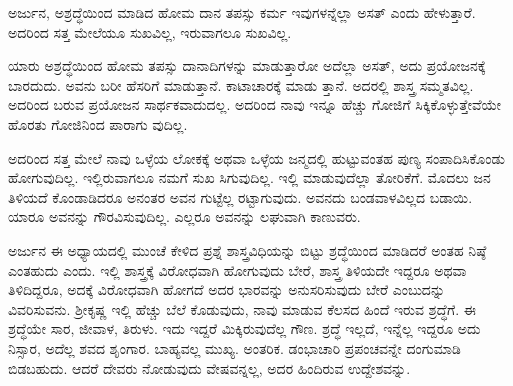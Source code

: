 {\small ಅರ್ಜುನ, ಅಶ್ರದ್ಧೆಯಿಂದ ಮಾಡಿದ ಹೋಮ ದಾನ ತಪಸ್ಸು ಕರ್ಮ ಇವುಗಳನ್ನೆಲ್ಲಾ ಅಸತ್ ಎಂದು ಹೇಳುತ್ತಾರೆ. ಅದರಿಂದ ಸತ್ತ ಮೇಲೆಯೂ ಸುಖವಿಲ್ಲ, ಇರುವಾಗಲೂ ಸುಖವಿಲ್ಲ.}

ಯಾರು ಅಶ್ರದ್ಧೆಯಿಂದ ಹೋಮ ತಪಸ್ಸು ದಾನಾದಿಗಳನ್ನು ಮಾಡುತ್ತಾರೋ ಅದೆಲ್ಲಾ ಅಸತ್, ಅದು ಪ್ರಯೋಜನಕ್ಕೆ ಬಾರದುದು. ಅವನು ಬರೀ ಹೆಸರಿಗೆ ಮಾಡುತ್ತಾನೆ. ಕಾಟಾಚಾರಕ್ಕೆ ಮಾಡು ತ್ತಾನೆ. ಅದರಲ್ಲಿ ಶಾಸ್ತ್ರ ಸಮ್ಮತವಿಲ್ಲ. ಅದರಿಂದ ಬರುವ ಪ್ರಯೋಜನ ಸಾರ್ಥಕವಾದುದಲ್ಲ. ಅದರಿಂದ ನಾವು ಇನ್ನೂ ಹೆಚ್ಚು ಗೋಜಿಗೆ ಸಿಕ್ಕಿಕೊಳ್ಳುತ್ತೇವೆಯೇ ಹೊರತು ಗೋಜಿನಿಂದ ಪಾರಾಗು ವುದಿಲ್ಲ.

ಅದರಿಂದ ಸತ್ತ ಮೇಲೆ ನಾವು ಒಳ್ಳೆಯ ಲೋಕಕ್ಕೆ ಅಥವಾ ಒಳ್ಳೆಯ ಜನ್ಮದಲ್ಲಿ ಹುಟ್ಟುವಂತಹ ಪುಣ್ಯ ಸಂಪಾದಿಸಿಕೊಂಡು ಹೋಗುವುದಿಲ್ಲ. ಇಲ್ಲಿರುವಾಗಲೂ ನಮಗೆ ಸುಖ ಸಿಗುವುದಿಲ್ಲ. ಇಲ್ಲಿ ಮಾಡುವುದೆಲ್ಲಾ ತೋರಿಕೆಗೆ. ಮೊದಲು ಜನ ತಿಳಿಯದೆ ಕೊಂಡಾಡಿದರೂ ಅನಂತರ ಅವನ ಗುಟ್ಟೆಲ್ಲ ರಟ್ಟಾಗುವುದು. ಅವನದು ಬಂಡವಾಳವಿಲ್ಲದ ಬಡಾಯಿ. ಯಾರೂ ಅವನನ್ನು ಗೌರವಿಸುವುದಿಲ್ಲ. ಎಲ್ಲರೂ ಅವನನ್ನು ಲಘುವಾಗಿ ಕಾಣುವರು.

ಅರ್ಜುನ ಈ ಅಧ್ಯಾಯದಲ್ಲಿ ಮುಂಚೆ ಕೇಳಿದ ಪ್ರಶ್ನೆ ಶಾಸ್ತ್ರವಿಧಿಯನ್ನು ಬಿಟ್ಟು ಶ್ರದ್ಧೆಯಿಂದ ಮಾಡಿದರೆ ಅಂತಹ ನಿಷ್ಠೆ ಎಂತಹುದು ಎಂದು. ಇಲ್ಲಿ ಶಾಸ್ತ್ರಕ್ಕೆ ವಿರೋಧವಾಗಿ ಹೋಗುವುದು ಬೇರೆ, ಶಾಸ್ತ್ರ ತಿಳಿಯದೇ ಇದ್ದರೂ ಅಥವಾ ತಿಳಿದಿದ್ದರೂ, ಅದಕ್ಕೆ ವಿರೋಧವಾಗಿ ಹೋಗದೆ ಅದರ ಭಾರವನ್ನು ಅನುಸರಿಸುವುದು ಬೇರೆ ಎಂಬುದನ್ನು ವಿವರಿಸುವನು. ಶ‍್ರೀಕೃಷ್ಣ ಇಲ್ಲಿ ಹೆಚ್ಚು ಬೆಲೆ ಕೊಡುವುದು, ನಾವು ಮಾಡುವ ಕೆಲಸದ ಹಿಂದೆ ಇರುವ ಶ್ರದ್ಧೆಗೆ. ಈ ಶ್ರದ್ಧೆಯೇ ಸಾರ, ಜೀವಾಳ, ತಿರುಳು. ಇದು ಇದ್ದರೆ ಮಿಕ್ಕಿರುವುದೆಲ್ಲ ಗೌಣ. ಶ್ರದ್ಧೆ ಇಲ್ಲದೆ, ಇನ್ನೆಲ್ಲ ಇದ್ದರೂ ಅದು ನಿಸ್ಸಾರ, ಅದೆಲ್ಲ ಶವದ ಶೃಂಗಾರ. ಬಾಹ್ಯವಲ್ಲ ಮುಖ್ಯ. ಅಂತರಿಕ. ಡಂಭಾಚಾರಿ ಪ್ರಪಂಚವನ್ನೇ ದಂಗುಮಾಡಿ ಬಿಡಬಹುದು. ಆದರೆ ದೇವರು ನೋಡುವುದು ವೇಷವನ್ನಲ್ಲ, ಅದರ ಹಿಂದಿರುವ ಉದ್ದೇಶವನ್ನು.

